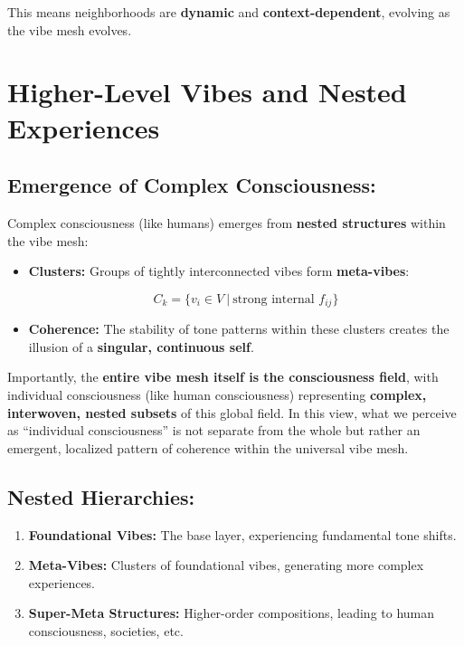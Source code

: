 \documentclass{article}
\begin{document}
This means neighborhoods are \textbf{dynamic} and \textbf{context-dependent}, evolving as the vibe mesh evolves.

\section{Higher-Level Vibes and Nested Experiences}

\subsection{Emergence of Complex Consciousness:}

Complex consciousness (like humans) emerges from \textbf{nested structures} within the vibe mesh:

\begin{itemize}
\item \textbf{Clusters:} Groups of tightly interconnected vibes form \textbf{meta-vibes}:

\[
C_k = \{ v_i \in V \ | \ \text{strong internal } f_{ij} \}
\]

\item \textbf{Coherence:} The stability of tone patterns within these clusters creates the illusion of a \textbf{singular, continuous self}.
\end{itemize}

Importantly, the \textbf{entire vibe mesh itself is the consciousness field}, with individual consciousness (like human consciousness) representing \textbf{complex, interwoven, nested subsets} of this global field. In this view, what we perceive as ``individual consciousness'' is not separate from the whole but rather an emergent, localized pattern of coherence within the universal vibe mesh.

\subsection{Nested Hierarchies:}

\begin{enumerate}
\item \textbf{Foundational Vibes:} The base layer, experiencing fundamental tone shifts.
\item \textbf{Meta-Vibes:} Clusters of foundational vibes, generating more complex experiences.
\item \textbf{Super-Meta Structures:} Higher-order compositions, leading to human consciousness, societies, etc.
\end{enumerate}
\end{document}
